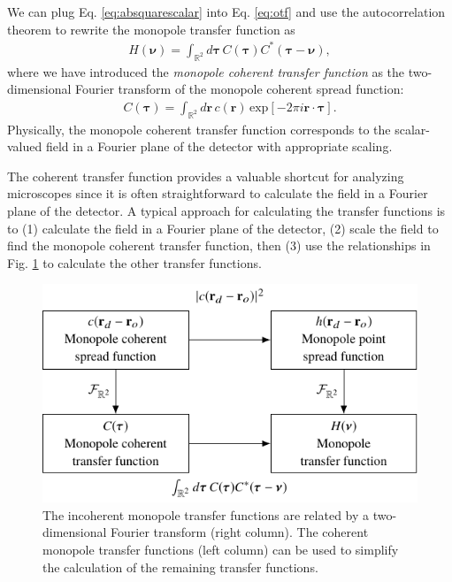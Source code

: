 \documentclass[]{osa-article}
\providecommand{\mb}[1]{\mathbf{#1}}
\providecommand{\mbb}[1]{\mathbb{#1}}
\providecommand{\bs}[1]{\boldsymbol{#1}}
\providecommand{\bv}{\bs{\nu}}
\providecommand{\taup}{\bs{\tau}}
\begin{document}
We can plug Eq. \eqref{eq:absquarescalar} into Eq. \eqref{eq:otf} and use the
autocorrelation theorem to rewrite the monopole transfer function as
\begin{align}
  H(\bv) = \int_{\mbb{R}^2}d\taup\, C(\taup)C^*(\taup - \bv), 
\end{align}
where we have introduced the
\textit{monopole coherent transfer function} as the two-dimensional Fourier
transform of the monopole coherent spread function:
\begin{align}
  C(\taup) = \int_{\mbb{R}^2}d\mb{r}\, c(\mb{r})\,\text{exp}[-2\pi i\mb{r}\cdot\taup].
\end{align}
Physically, the monopole coherent transfer function corresponds to the
scalar-valued field in a Fourier plane of the detector with appropriate scaling.

The coherent transfer function provides a valuable shortcut for analyzing
microscopes since it is often straightforward to calculate the field in a
Fourier plane of the detector. A typical approach for calculating the transfer
functions is to (1) calculate the field in a Fourier plane of the detector, (2)
scale the field to find the monopole coherent transfer function, then (3) use
the relationships in Fig. \ref{fig:monopole-transfer-functions} to calculate
the other transfer functions.

\begin{figure}
  \centering
  \includegraphics[scale=1.0]{../figures/monopole-transfer-functions/monopole-transfer-functions.pdf}
  \caption{The incoherent monopole transfer functions are related by a
    two-dimensional Fourier transform (right column). The coherent monopole
    transfer functions (left column) can be used to simplify the calculation of
    the remaining transfer functions.}
   \label{fig:monopole-transfer-functions}
 \end{figure}
\end{document}
